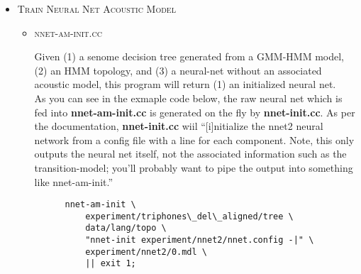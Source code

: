 \documentclass[10pt,a4paper]{article}
\begin{document}
\begin{itemize}

\vspace{1cm}
\item \textsc{Train Neural Net Acoustic Model}
  \begin{itemize}
    \vspace{.25cm}
  \item \textsc{nnet-am-init.cc}

    Given (1) a senome decision tree generated from a GMM-HMM model, (2) an HMM topology, and (3) a neural-net without an associated acoustic model, this program will return (1) an initialized neural net. \\

As you can see in the exmaple code below, the raw neural net which is fed into \textbf{nnet-am-init.cc} is generated on the fly by \textbf{nnet-init.cc}. As per the documentation, \textbf{nnet-init.cc} wiil ``[i]nitialize the nnet2 neural network from a config file with a line for each component.  Note, this only outputs the neural net itself, not the associated information such as the transition-model; you'll probably want to pipe the output into something like nnet-am-init.''\\

    \begin{verbatim}
      nnet-am-init \
          experiment/triphones\_del\_aligned/tree \
          data/lang/topo \
          "nnet-init experiment/nnet2/nnet.config -|" \
          experiment/nnet2/0.mdl \
          || exit 1;
    \end{verbatim}

  \end{itemize}
\end{itemize}
\end{document}
